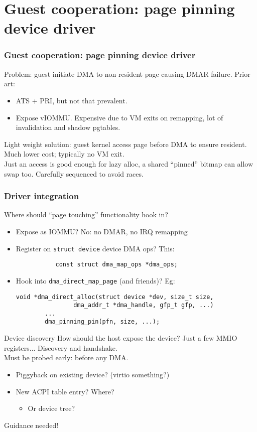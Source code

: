 \documentclass{beamer}
\begin{document}
\section{Guest cooperation: page pinning device driver}
\begin{frame}[fragile]
  \frametitle{Guest cooperation: page pinning device driver}
  Problem: guest initiate DMA to non-resident page causing DMAR failure.
  Prior art:
  \begin{itemize}
    \item ATS + PRI, but not that prevalent.
    \item Expose vIOMMU. Expensive due to VM exits on remapping, lot of invalidation and shadow pgtables.
  \end{itemize}
   Light weight solution: guest kernel access page before DMA to ensure resident. Much lower cost; typically no VM exit.\\

  Just an access is good enough for lazy alloc, a shared ``pinned'' bitmap can allow swap too. Carefully sequenced to avoid races.
\end{frame}

\begin{frame}[fragile]
  \frametitle{Driver integration}
  Where should ``page touching'' functionality hook in?
  \begin{itemize}
    \item Expose as IOMMU? No: no DMAR, no IRQ remapping
    \item Register on \texttt{struct device} device DMA ops? This:
      \begin{verbatim}
           const struct dma_map_ops *dma_ops;
      \end{verbatim}
    \item Hook into \texttt{dma\_direct\_map\_page} (and friends)? Eg:\\
      \begin{verbatim}
void *dma_direct_alloc(struct device *dev, size_t size,
                dma_addr_t *dma_handle, gfp_t gfp, ...)
        ...
        dma_pinning_pin(pfn, size, ...);
      \end{verbatim}
  \end{itemize}
\end{frame}

\begin{frame}{Device discovery}
  How should the host expose the device?
  Just a few MMIO registers... Discovery and handshake.\\
  
  Must be probed early: before any DMA.\\
  \begin{itemize}
    \item Piggyback on existing device? (virtio something?)
    \item New ACPI table entry? Where?
      \begin{itemize}
        \item Or device tree?
      \end{itemize}
  \end{itemize}
  Guidance needed!
\end{frame}
\end{document}
